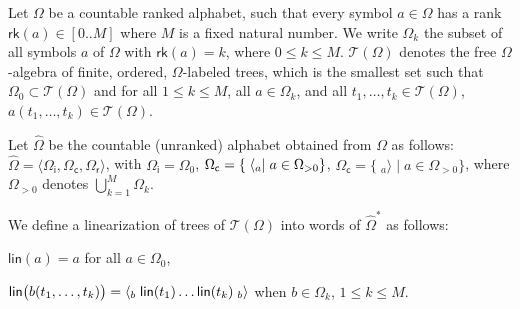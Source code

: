 \documentclass[runningheads]{llncs}
\def\<#1>{\langle #1 \rangle}
\newcommand{\T}{\mathcal{T}}
\newcommand{\call}[1]{\ensuremath #1} %
\newcommand{\return}[1]{\ensuremath #1} %
\def\Omegai{{\Omega_\mathsf{i}}}
\def\Omegac{{\Omega_\mathsf{c}}}
\def\Omegar{{\Omega_\mathsf{r}}}
\newcommand{\rank}{\mathsf{rk}}
\newcommand{\lin}{\mathsf{lin}}
\begin{document}
Let $\Omega$ be a countable ranked alphabet, such that 
every symbol $a \in \Omega$ has a rank 
$\rank(a) \in [0..M]$ where $M$ is a fixed natural number.
We write $\Omega_k$ the subset of all symbols $a$ of $\Omega$
with $\rank(a) = k$, where $0 \leq k \leq M$.
%
$\T(\Omega)$ denotes the free $\Omega$-algebra of finite, ordered, 
$\Omega$-labeled trees, 
which is the smallest set such that  $\Omega_0 \subset \T(\Omega)$
and for all $1 \leq k \leq M$, all $a \in \Omega_k$, 
and all $t_1, \ldots, t_k \in \T(\Omega)$, $a(t_1, \ldots, t_k) \in \T(\Omega)$.
%

\renewcommand{\call}[1]{\ensuremath \langle_{#1}}
\renewcommand{\return}[1]{\ensuremath {}_{#1}{\rangle}} %

Let $\hat\Omega$ be the countable (unranked) alphabet obtained from 
$\Omega$ as follows: 
$\hat\Omega = \< \Omegai, \Omegac, \Omegar >$, with
$\Omegai = \Omega_0$, 
$\Omegac = \{ \; \call{a} \mid a \in \Omega_{>0} \}$,
$\Omegac = \{ \; \return{a} \mid a \in \Omega_{>0} \}$,
where $\Omega_{>0}$ denotes $\bigcup_{k = 1}^{M} \Omega_k$.

\noindent
We define a linearization of trees of $\T(\Omega)$ into 
words of $\hat{\Omega}^*$ as follows:
\begin{description}
\item $\lin(a) = a$ for all $a \in \Omega_0$, 
\item $\lin\bigl( b(t_1, \ldots, t_k)\bigr) = 
       \call{b} \; \lin(t_1) \ldots \lin(t_k) \; \return{b}$ 
       when $b \in \Omega_k$, $1 \leq k \leq M$.
\end{description}

\end{document}
